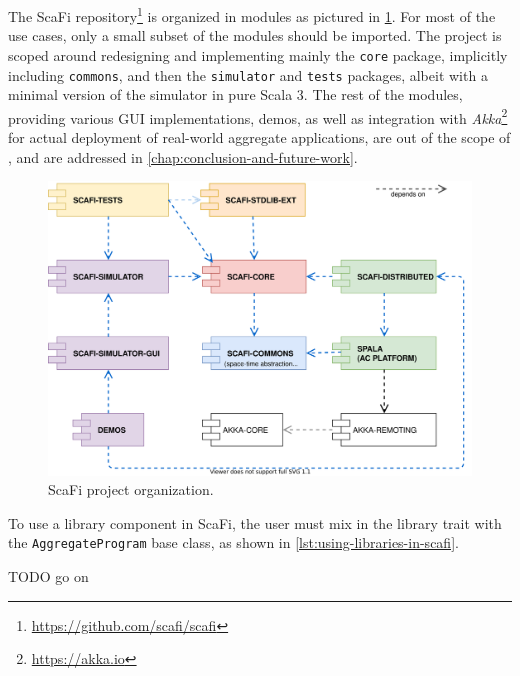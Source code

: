 The ScaFi repository\footnote{\url{https://github.com/scafi/scafi}} is organized in modules as pictured in \cref{fig:scafi-project-org}.
%
For most of the use cases, only a small subset of the modules should be imported.
%
The \this project is scoped around redesigning and implementing mainly the \texttt{core} package, implicitly including \texttt{commons}, and then the \texttt{simulator} and \texttt{tests} packages, albeit with a minimal version of the simulator in pure Scala 3.
%
The rest of the modules, providing various \ac{GUI} implementations, demos, as well as integration with \textit{Akka}\footnote{\url{https://akka.io}} for actual deployment of real-world aggregate applications, are out of the scope of \this, and are addressed in \cref{chap:conclusion-and-future-work}.

\begin{figure}
    \centering
    \includegraphics[width=.8\linewidth]{figures/scafi-project-org.drawio.png}
    \caption{ScaFi project organization.}
    \label{fig:scafi-project-org}
\end{figure}


To use a library component in ScaFi, the user must mix in the library trait with the \texttt{AggregateProgram} base class, as shown in \cref{lst:using-libraries-in-scafi}.



TODO go on

